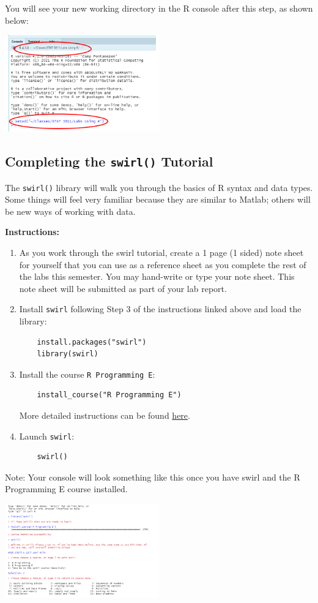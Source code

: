 \documentclass{article}
\begin{document}
You will see your new working directory in the R console after this step, as shown below:

\begin{center}
    \includegraphics[width=0.5\textwidth]{3611_p2.png}
\end{center}

\subsection*{Completing the \texttt{swirl()} Tutorial}
The \texttt{swirl()} library will walk you through the basics of R syntax and data types. Some things will feel very familiar because they are similar to Matlab; others will be new ways of working with data.

\textbf{Instructions:}
\begin{enumerate} 
    \item  As you work through the swirl tutorial, create a 1 page (1 sided) note sheet for yourself that you can use as a reference sheet as you complete the rest of the labs this semester.  You may hand-write or type your note sheet.  This note sheet will be submitted as part of your lab report.  

    \item Install \texttt{swirl} following Step 3 of the instructions linked above and load the library:
    \begin{verbatim}
    install.packages("swirl")
    library(swirl)
    \end{verbatim}
    \item Install the course \texttt{R Programming E}:
    \begin{verbatim}
    install_course("R Programming E")
    \end{verbatim}
    More detailed instructions can be found \href{https://github.com/swirldev/swirl_courses#swirl-courses}{here}.
    \item Launch \texttt{swirl}:
    \begin{verbatim}
    swirl()
    \end{verbatim}
\end{enumerate}
Note: Your console will look something like this once you have swirl and the R Programming E course installed.
\begin{center}
    \includegraphics[width=0.5\textwidth]{3611_p3.png}
\end{center}
\end{document}
